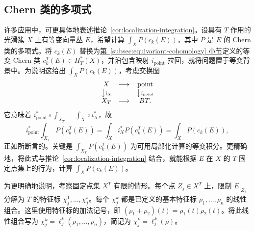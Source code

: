 \subsection{Chern 类的多项式}\label{subsec:chern-polynomial-localization}
许多应用中，可更具体地表述推论~\ref{cor:localization-integration}。设具有 $T$ 作用的光滑簇 $X$ 上有等变向量丛 $E$，希望计算 $\int_XP(c_k(E))$，其中 $P$ 是 $E$ 的 Chern 类的多项式。将 $c_k(E)$ 替换为\hyperref[subsec:equivariant-cohomology]{第~\ref*{subsec:equivariant-cohomology} 小节}定义的等变 Chern 类 $c_k^T(E)\in H_T^*(X)$，并沿包含映射 $i_{\mathrm{point}}$ 拉回，就将问题置于等变背景中。为说明这给出 $\int_XP(c_k(E))$，考虑交换图
\begin{equation}\label{eq:equivariant-integral-forgetting-diagram}
\begin{array}{ccc}
X&\longrightarrow&\mathrm{point}\\
\big\downarrow\scriptstyle i_X&&\big\downarrow\scriptstyle i_{\mathrm{point}}\\
X_T&\longrightarrow&BT.
\end{array}
\end{equation}
它意味着 $i_{\mathrm{point}}^*\circ\int_{X_T}=\int_X\circ i_X^*$，故
\[
i_{\mathrm{point}}^*\int_{X_T}P(c_k^T(E))
=\int_Xi_X^*P(c_k^T(E))=\int_XP(c_k(E)),
\]
正如所断言的。关键是 $\int_{X_T}P(c_k^T(E))$ 为可用局部化计算的等变积分。更精确地，将此式与推论~\ref{cor:localization-integration} 结合，就能根据 $E$ 在 $X$ 的 $T$ 固定点集上的行为，计算 $\int_XP(c_k(E))$。

为更明确地说明，考察固定点集 $X^T$ 有限的情形。每个点 $Z_j\in X^T$ 上，限制 $E|_{Z_j}$ 分解为 $T$ 的特征标 $\chi_j^1,\ldots,\chi_j^s$。每个 $\chi_j^k$ 都是已定义的基本特征标 $\rho_1,\ldots,\rho_n$ 的线性组合。这里使用特征标的加法记号，即 $(\rho_1+\rho_2)(t)=\rho_1(t)\rho_2(t)$。将此线性组合写为 $\chi_j^k=\ell_j^k(\rho_1,\ldots,\rho_n)$，简记为 $\chi_j^k=\ell_j^k(\rho)$。

